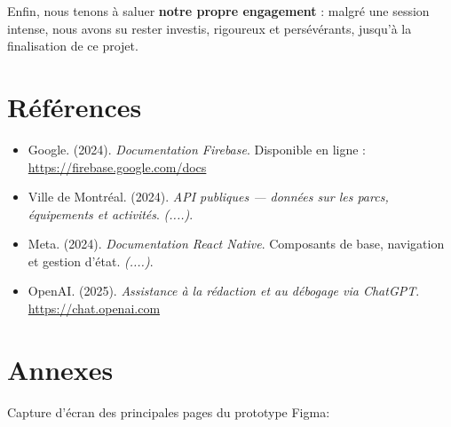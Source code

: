 \documentclass[12pt,a4paper]{article}
\begin{document}
Enfin, nous tenons à saluer \textbf{notre propre engagement} : malgré une session intense, nous avons su rester investis, rigoureux et persévérants, jusqu'à la finalisation de ce projet.


\clearpage
\section*{Références}

\begin{itemize}

  \item Google. (2024). \textit{Documentation Firebase}. Disponible en ligne : \url{https://firebase.google.com/docs}

  \item Ville de Montréal. (2024). \textit{API publiques — données sur les parcs, équipements et activités}. \emph{(....)}.

  \item Meta. (2024). \textit{Documentation React Native}. Composants de base, navigation et gestion d'état. \emph{(....)}.

  \item OpenAI. (2025). \textit{Assistance à la rédaction et au débogage via ChatGPT}. \url{https://chat.openai.com}
\end{itemize}


\clearpage
\appendix
\section{Annexes}

Capture d'écran des principales pages du prototype Figma:
\end{document}
